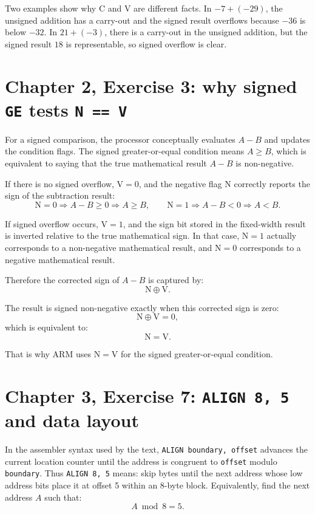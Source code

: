 \documentclass[11pt]{article}
\newcommand{\code}[1]{\texttt{#1}}
\begin{document}
Two examples show why \(\mathrm{C}\) and \(\mathrm{V}\) are different facts. In \(-7 + (-29)\), the unsigned addition has a carry-out and the signed result overflows because \(-36\) is below \(-32\). In \(21 + (-3)\), there is a carry-out in the unsigned addition, but the signed result \(18\) is representable, so signed overflow is clear.

\section*{Chapter 2, Exercise 3: why signed \code{GE} tests \code{N == V}}

For a signed comparison, the processor conceptually evaluates \(A-B\) and updates the condition flags. The signed greater-or-equal condition means \(A \ge B\), which is equivalent to saying that the true mathematical result \(A-B\) is non-negative.

If there is no signed overflow, \(\mathrm{V}=0\), and the negative flag \(\mathrm{N}\) correctly reports the sign of the subtraction result:
\[
\mathrm{N}=0 \Rightarrow A-B \ge 0 \Rightarrow A \ge B,
\qquad
\mathrm{N}=1 \Rightarrow A-B < 0 \Rightarrow A < B.
\]

If signed overflow occurs, \(\mathrm{V}=1\), and the sign bit stored in the fixed-width result is inverted relative to the true mathematical sign. In that case, \(\mathrm{N}=1\) actually corresponds to a non-negative mathematical result, and \(\mathrm{N}=0\) corresponds to a negative mathematical result.

Therefore the corrected sign of \(A-B\) is captured by:
\[
\mathrm{N} \oplus \mathrm{V}.
\]

The result is signed non-negative exactly when this corrected sign is zero:
\[
\mathrm{N} \oplus \mathrm{V} = 0,
\]
which is equivalent to:
\[
\mathrm{N} = \mathrm{V}.
\]

That is why ARM uses \(\mathrm{N} = \mathrm{V}\) for the signed greater-or-equal condition.

\section*{Chapter 3, Exercise 7: \code{ALIGN 8, 5} and data layout}

In the assembler syntax used by the text, \code{ALIGN boundary, offset} advances the current location counter until the address is congruent to \code{offset} modulo \code{boundary}. Thus \code{ALIGN 8, 5} means: skip bytes until the next address whose low address bits place it at offset 5 within an 8-byte block. Equivalently, find the next address \(A\) such that:
\[
A \bmod 8 = 5.
\]
\end{document}
